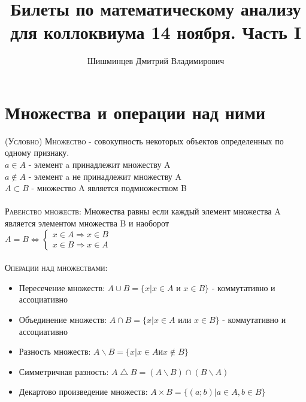 \documentclass[14pt]{article}
\title{Билеты по математическому анализу для коллоквиума 14 ноября. Часть I }
\author{Шишминцев Дмитрий Владимирович}
\begin{document}
    \maketitle
    \tableofcontents
    \newpage
    
    \section{Множества и операции над ними}
        \textsc{(Условно) Множество  }
         - совокупность некоторых объектов определенных по одному признаку. \\
        $ a \in A $ - элемент a принадлежит множеству A \\ 
        $ a \notin A $ - элемент a не принадлежит множеству A \\ 
        $ A \subset B $ - множество A является подмножеством B \\
        \\
        \textsc{Равенство множеств: } Множества равны если каждый элемент множества A является элементом множества B и наоборот \\
        $A = B \Leftrightarrow \begin{cases}
            x \in A \Rightarrow x \in B \\ 
            x \in B \Rightarrow x \in A
        \end{cases}$\\
        \\
        \textsc{Операции над множествами:}
        \begin{itemize}
            \item Пересечение множеств: $ A \cup B = \{ x| x \in A$ и $x \in B \}$ - коммутативно и ассоциативно
            \item Объединение множеств: $ A \cap B = \{ x | x \in A$ или $x \in B \}$ - коммутативно и ассоциативно
            \item Разность множеств: $ A \backslash B = \{ x | x \in A $и$ x \notin B \} $
            \item Симметричная разность: $ A \bigtriangleup B = (A \backslash B) \cap (B \backslash A)$
            \item Декартово произведение множеств: $ A \times B = \{(a; b) | a \in A, b \in B \}$
        \end{itemize}
           
\end{document}
